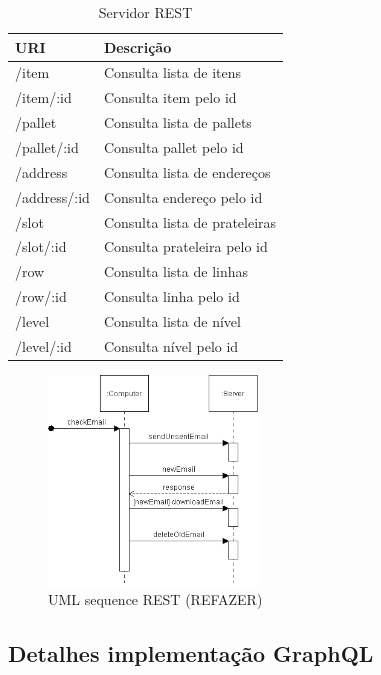 \begin{table}
    \centering
    \begin{tabular}{| l | l |}
        \hline
        \textbf{URI} & \textbf{Descrição} \\ \hline
        /item & Consulta lista de itens \\ \hline
        /item/:id & Consulta item pelo id \\ \hline
        /pallet & Consulta lista de pallets  \\ \hline
        /pallet/:id & Consulta pallet pelo id  \\ \hline
        /address & Consulta lista de endereços \\ \hline
        /address/:id & Consulta endereço pelo id \\ \hline
        /slot & Consulta lista de prateleiras \\ \hline
        /slot/:id & Consulta prateleira pelo id \\ \hline
        /row & Consulta lista de linhas \\ \hline
        /row/:id & Consulta linha pelo id \\ \hline
        /level & Consulta lista de nível \\ \hline
        /level/:id & Consulta nível pelo id \\ \hline
    \end{tabular}
    \caption{Servidor REST} \label{tab:rest-url}
\end{table}

\begin{figure}[htbp]
\centering
\includegraphics[width=0.5\textwidth]{figuras/uml-sequence.png}
\caption{UML sequence REST (REFAZER)}
\label{fig:rest-uml}
\author{fonte: Autor}
\end{figure}

\subsection{Detalhes implementação GraphQL}

